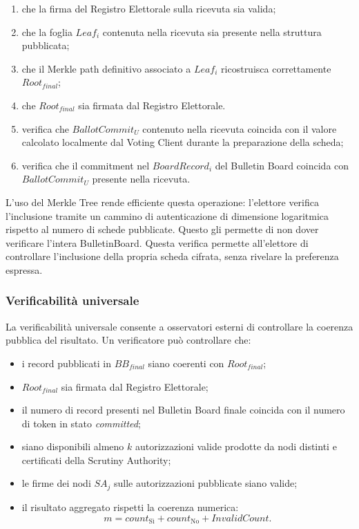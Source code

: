 \documentclass[a4paper,12pt]{article}
\begin{document}
\begin{enumerate}
	\item che la firma del Registro Elettorale sulla ricevuta sia valida;
	\item che la foglia \(Leaf_i\) contenuta nella ricevuta sia presente nella struttura pubblicata;
	\item che il Merkle path definitivo associato a \(Leaf_i\) ricostruisca correttamente \(Root_{final}\);
	\item che \(Root_{final}\) sia firmata dal Registro Elettorale.
    \item verifica che \(BallotCommit_U\) contenuto nella ricevuta coincida con il valore calcolato localmente dal Voting Client durante la preparazione della scheda;
    \item verifica che il commitment nel \(BoardRecord_i\) del Bulletin Board coincida con \(BallotCommit_U\) presente nella ricevuta.
\end{enumerate}

L'uso del Merkle Tree rende efficiente questa operazione: l'elettore verifica l'inclusione tramite un cammino di autenticazione di dimensione logaritmica rispetto al numero di schede pubblicate. Questo gli permette di non dover verificare l'intera BulletinBoard.
Questa verifica permette all'elettore di controllare l'inclusione della propria scheda cifrata, senza rivelare la preferenza espressa.

\subsubsection{Verificabilit\`a universale}

La verificabilit\`a universale consente a osservatori esterni di controllare la coerenza pubblica del risultato.
Un verificatore pu\`o controllare che:

\begin{itemize}
	\item i record pubblicati in \(BB_{final}\) siano coerenti con \(Root_{final}\);
	\item \(Root_{final}\) sia firmata dal Registro Elettorale;
	\item il numero di record presenti nel Bulletin Board finale coincida con il numero di token in stato \emph{committed};
	\item siano disponibili almeno \(k\) autorizzazioni valide prodotte da nodi distinti e certificati della Scrutiny Authority;
	\item le firme dei nodi \(SA_j\) sulle autorizzazioni pubblicate siano valide;
	\item il risultato aggregato rispetti la coerenza numerica:
	\[
		m = count_{\text{S\`i}} + count_{\text{No}} + InvalidCount.
	\]
\end{itemize}
\end{document}
